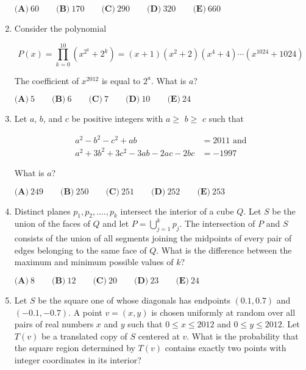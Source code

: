 \documentclass{article}
\begin{document}
\begin{enumerate}[label=\arabic*., itemsep=0.5em]
\( \textbf{(A)}\ 60
\qquad\textbf{(B)}\ 170
\qquad\textbf{(C)}\ 290
\qquad\textbf{(D)}\ 320
\qquad\textbf{(E)}\ 660
 \)\par \vspace{0.5em}\item Consider the polynomial


\begin{equation*}
P(x)=\prod_{k=0}^{10}(x^{2^k}+2^k)=(x+1)(x^2+2)(x^4+4)\cdots (x^{1024}+1024)
\end{equation*}


The coefficient of \(x^{2012}\) is equal to \(2^a\).  What is \(a\)?

\( \textbf{(A)}\ 5
\qquad\textbf{(B)}\ 6
\qquad\textbf{(C)}\ 7
\qquad\textbf{(D)}\ 10
\qquad\textbf{(E)}\ 24
 \)\par \vspace{0.5em}\item Let \(a\), \(b\), and \(c\) be positive integers with \(a\ge\) \(b\ge\) \(c\) such that

\begin{align*}a^{2}-b^{2}-c^{2}+ab&=2011\text{ and}\\
a^{2}+3b^{2}+3c^{2}-3ab-2ac-2bc&=-1997
\end{align*}

What is \(a\)?

\( \textbf{(A)}\ 249\qquad\textbf{(B)}\ 250\qquad\textbf{(C)}\ 251\qquad\textbf{(D)}\ 252\qquad\textbf{(E)}\ 253 \)\par \vspace{0.5em}\item Distinct planes \(p_1,p_2,....,p_k\) intersect the interior of a cube \(Q\). Let \(S\) be the union of the faces of \(Q\) and let \( P =\bigcup_{j=1}^{k}p_{j} \). The intersection of \(P\) and \(S\) consists of the union of all segments joining the midpoints of every pair of edges belonging to the same face of \(Q\). What is the difference between the maximum and minimum possible values of \(k\)?

\( \textbf{(A)}\ 8\qquad\textbf{(B)}\ 12\qquad\textbf{(C)}\ 20\qquad\textbf{(D)}\ 23\qquad\textbf{(E)}\ 24 \)\par \vspace{0.5em}\item Let \(S\) be the square one of whose diagonals has endpoints \((0.1,0.7)\) and \((-0.1,-0.7)\).  A point \(v=(x,y)\) is chosen uniformly at random over all pairs of real numbers \(x\) and \(y\) such that \(0 \le x \le 2012\) and \(0\le y\le 2012\).  Let \(T(v)\) be a translated copy of \(S\) centered at \(v\).  What is the probability that the square region determined by \(T(v)\) contains exactly two points with integer coordinates in its interior?


\end{enumerate}
\end{document}
